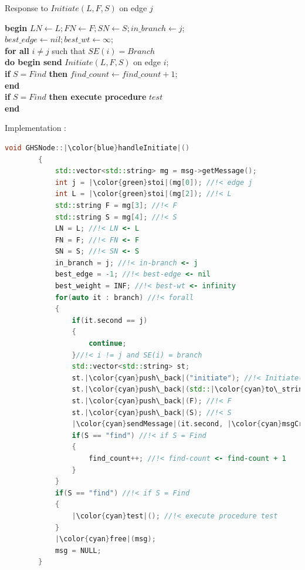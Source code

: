 \documentclass[letterpaper,11pt]{article}
\begin{document}
	\begin{tcolorbox}
		Response to $Initiate(L, F, S)$ on edge $j$
		\begin{algorithmic}
			\STATE \textbf{begin} $LN \leftarrow L; FN \leftarrow F;SN \leftarrow S; in\_branch \leftarrow j$; \\
			{\quad \qquad  \bf } $best\_edge \leftarrow nil; best\_wt \leftarrow \infty$; \\
			{\quad \qquad  \bf for all } $i \neq j$ such that $SE(i) = Branch$ \\
			{\qquad \qquad \quad \bf do begin send} $Initiate(L, F, S)$ on edge $i$; \\
			{\qquad \qquad \qquad \qquad \quad \bf if } $S = Find$ {\bf then} $find\_count \leftarrow find\_count + 1$; \\
			{\qquad \qquad  \qquad \quad \bf end } \\
			{\quad \qquad  \bf if } $S = Find$ {\bf then execute procedure} $test$\\
			{\bf end}
		\end{algorithmic}
	\end{tcolorbox}
	
	\bigskip 
	
	Implementation : 
	
	
	\begin{lstlisting}[language=C++, caption= handleInitiate()]
		void GHSNode::|\color{blue}handleInitiate|()
		{
			std::vector<std::string> mg = msg->getMessage();
			int j = |\color{green}stoi|(mg[0]); //!< edge j
			int L = |\color{green}stoi|(mg[2]); //!< L
			std::string F = mg[3]; //!< F
			std::string S = mg[4]; //!< S
			LN = L; //!< LN <- L
			FN = F; //!< FN <- F
			SN = S; //!< SN <- S
			in_branch = j; //!< in-branch <- j
			best_edge = -1; //!< best-edge <- nil
			best_weight = INF; //!< best-wt <- infinity
			for(auto it : branch) //!< forall
			{
				if(it.second == j)
				{
					continue;
				}//!< i != j and SE(i) = branch
				std::vector<std::string> st; 
				st.|\color{cyan}push\_back|("initiate"); //!< Initiate()
				st.|\color{cyan}push\_back|(std::|\color{cyan}to\_string|(L)); //!< L
				st.|\color{cyan}push\_back|(F); //!< F
				st.|\color{cyan}push\_back|(S); //!< S
				|\color{cyan}sendMessage|(it.second, |\color{cyan}msgCreater|(st)); //!< send Initiate(L, F, S) on edge i
				if(S == "find") //!< if S = Find 
				{
					find_count++; //!< find-count <- find-count + 1
				}
			}
			if(S == "find") //!< if S = Find
			{
				|\color{cyan}test|(); //!< execute procedure test
			}
			|\color{cyan}free|(msg);
			msg = NULL;
		}
	\end{lstlisting}
	
\end{document}
